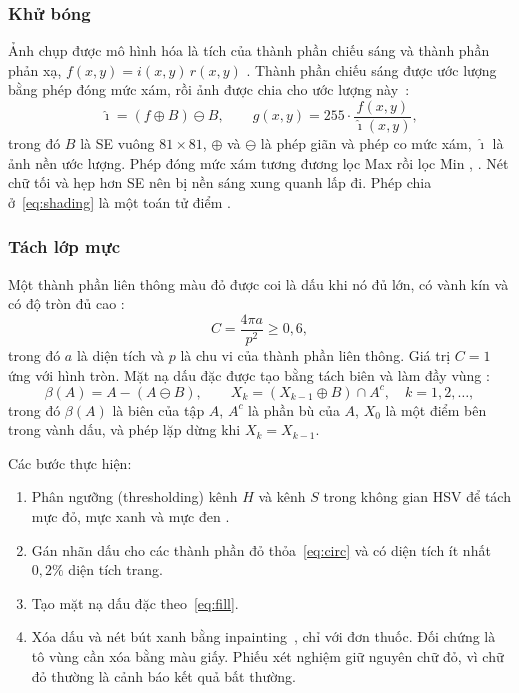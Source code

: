 \subsubsection{Khử bóng}
Ảnh chụp được mô hình hóa là tích của thành phần chiếu sáng và thành phần phản xạ, $f(x,y)=i(x,y)\,r(x,y)$ .
Thành phần chiếu sáng được ước lượng bằng phép đóng mức xám, rồi ảnh được chia cho ước lượng này~\cite{zhang2007whiteboard}:
\begin{equation}\label{eq:shading}
  \hat\imath=(f\oplus B)\ominus B,\qquad g(x,y)=255\cdot\frac{f(x,y)}{\hat\imath(x,y)},
\end{equation}
trong đó $B$ là SE vuông $81\times81$, $\oplus$ và $\ominus$ là phép giãn và phép co mức xám, $\hat\imath$ là ảnh nền ước lượng.
Phép đóng mức xám tương đương lọc Max rồi lọc Min , .
Nét chữ tối và hẹp hơn SE nên bị nền sáng xung quanh lấp đi.
Phép chia ở~\eqref{eq:shading} là một toán tử điểm .

\subsubsection{Tách lớp mực}
Một thành phần liên thông màu đỏ  được coi là dấu khi nó đủ lớn, có vành kín và có độ tròn đủ cao :
\begin{equation}\label{eq:circ}
  C=\frac{4\pi a}{p^2}\ge 0{,}6,
\end{equation}
trong đó $a$ là diện tích và $p$ là chu vi của thành phần liên thông.
Giá trị $C=1$ ứng với hình tròn.
Mặt nạ dấu đặc được tạo bằng tách biên và làm đầy vùng :
\begin{equation}\label{eq:fill}
  \beta(A)=A-(A\ominus B),\qquad X_k=(X_{k-1}\oplus B)\cap A^c,\quad k=1,2,\dots,
\end{equation}
trong đó $\beta(A)$ là biên của tập $A$, $A^c$ là phần bù của $A$, $X_0$ là một điểm bên trong vành dấu, và phép lặp dừng khi $X_k=X_{k-1}$.

Các bước thực hiện:
\begin{enumerate}
  \item Phân ngưỡng (thresholding) kênh $H$ và kênh $S$ trong không gian HSV để tách mực đỏ, mực xanh và mực đen .
  \item Gán nhãn dấu cho các thành phần đỏ thỏa~\eqref{eq:circ} và có diện tích ít nhất $0{,}2\%$ diện tích trang.
  \item Tạo mặt nạ dấu đặc theo~\eqref{eq:fill}.
  \item Xóa dấu và nét bút xanh bằng inpainting~\cite{telea2004inpainting}, chỉ với đơn thuốc.
        Đối chứng là tô vùng cần xóa bằng màu giấy.
        Phiếu xét nghiệm giữ nguyên chữ đỏ, vì chữ đỏ thường là cảnh báo kết quả bất thường.
\end{enumerate}

